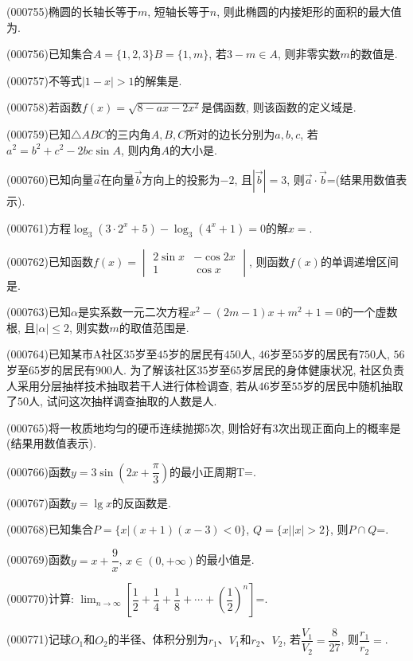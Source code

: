 \item (000755)椭圆的长轴长等于$m$, 短轴长等于$n$, 则此椭圆的内接矩形的面积的最大值为.
\item (000756)已知集合$A=\{1,2,3\}B=\{1,m\}$, 若$3-m\in A$, 则非零实数$m$的数值是.
\item (000757)不等式$|1-x|>1$的解集是.
\item (000758)若函数$f(x)=\sqrt{8-ax-2x^2}$是偶函数, 则该函数的定义域是.
\item (000759)已知$\triangle ABC$的三内角$A,B,C$所对的边长分别为$a,b,c$, 若$a^2=b^2+c^2-2bc\sin A$, 则内角$A$的大小是.
\item (000760)已知向量$\overrightarrow a$在向量$\overrightarrow b$方向上的投影为$-2$, 且$|\overrightarrow b|=3$, 则$\overrightarrow a\cdot \overrightarrow b$=(结果用数值表示).
\item (000761)方程$\log_3(3 \cdot 2^x+5)-\log_3(4^x+1)=0$的解$x=$.
\item (000762)已知函数$f(x)=\begin{vmatrix}
2\sin x & -\cos 2x  \\ 1  & \cos x  \end{vmatrix}$, 则函数$f(x)$的单调递增区间是.
\item (000763)已知$\alpha$是实系数一元二次方程$x^2-(2m-1)x+m^2+1=0$的一个虚数根, 且$|\alpha|\le 2$, 则实数$m$的取值范围是.
\item (000764)已知某市A社区$35$岁至$45$岁的居民有$450$人, $46$岁至$55$岁的居民有$750$人, $56$岁至$65$岁的居民有$900$人. 为了解该社区$35$岁至$65$岁居民的身体健康状况, 社区负责人采用分层抽样技术抽取若干人进行体检调查, 若从$46$岁至$55$岁的居民中随机抽取了$50$人, 试问这次抽样调查抽取的人数是人.
\item (000765)将一枚质地均匀的硬币连续抛掷$5$次, 则恰好有$3$次出现正面向上的概率是(结果用数值表示).
\item (000766)函数$y=3\sin(2x+\dfrac{\pi}3)$的最小正周期T=.
\item (000767)函数$y=\lg x$的反函数是.
\item (000768)已知集合$P=\{x|(x+1)(x-3)<0\}$, $Q=\{x||x|>2\}$, 则$P\cap Q$=.
\item (000769)函数$y=x+\dfrac9x$, $x\in (0,+\infty)$的最小值是.
\item (000770)计算: $\displaystyle\lim_{n\to\infty}[\dfrac12+\dfrac14+\dfrac18+\cdots+(\dfrac12)^n]$=.
\item (000771)记球$O_1$和$O_2$的半径、体积分别为$r_1$、$V_1$和$r_2$、$V_2$, 若$\dfrac{V_1}{V_2}=\dfrac8{27}$, 则$\dfrac{r_1}{r_2}=$.
